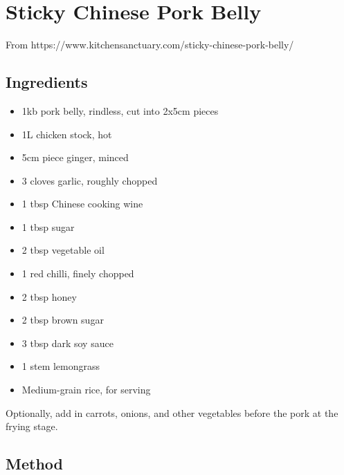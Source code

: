 \section{Sticky Chinese Pork Belly}


From https://www.kitchensanctuary.com/sticky-chinese-pork-belly/

\subsection{Ingredients}

\begin{itemize}
	\item 1kb pork belly, rindless, cut into 2x5cm pieces
	\item 1L chicken stock, hot
	\item 5cm piece ginger, minced
	\item 3 cloves garlic, roughly chopped
	\item 1 tbsp Chinese cooking wine
	\item 1 tbsp sugar
	\item 2 tbsp vegetable oil
	\item 1 red chilli, finely chopped
	\item 2 tbsp honey
	\item 2 tbsp brown sugar
	\item 3 tbsp dark soy sauce
	\item 1 stem lemongrass
	\item Medium-grain rice, for serving
\end{itemize}

Optionally, add in carrots, onions, and other vegetables before the pork at the frying stage.

\subsection{Method}

